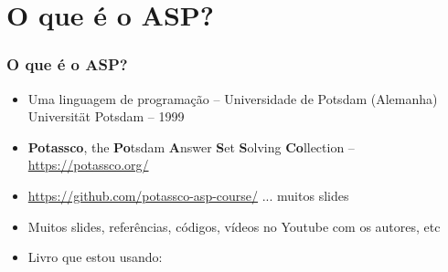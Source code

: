 \documentclass{beamer}
\begin{document}
\begin{comment}
\section{Para efeitos de TEMPLATE}
\begin{frame}
\frametitle{Nome do SLIDE}
\begin{block}{Nome do Bloco}
  \begin{itemize}
   \item T1

    \item<2-> T2

    \item<3-> T3

  \item<4-> 

    \item<5-> 
    
        \item<6-> 
    \end{itemize}
  
\end{block}

\end{frame}
\end{comment}

\section{O que é o ASP?}



\begin{frame}%

\frametitle{O que é o ASP?}


\begin{block}{}
  \begin{itemize}
   \item Uma linguagem de programação -- Universidade de Potsdam (Alemanha)\\ Universität Potsdam -- 1999
   
   \item  \textbf{Potassco}, the \textbf{Po}tsdam \textbf{A}nswer \textbf{S}et \textbf{S}olving \textbf{Co}llection -- \url{https://potassco.org/}
   
   \item \url{https://github.com/potassco-asp-course/} ... muitos slides

  \item  Muitos slides, referências, códigos, vídeos no Youtube com os autores, etc
  
  \item Livro que estou usando: 
       

    \end{itemize}
  
\end{block}

\end{frame}
\end{document}
